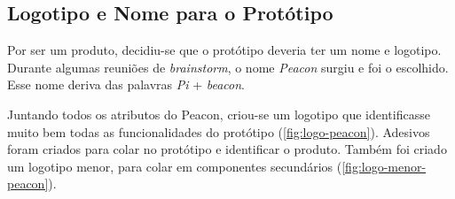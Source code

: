 \subsection{Logotipo e Nome para o Protótipo}\label{sec:logotipo-prototipo}

Por ser um produto, decidiu-se que o protótipo deveria ter um nome e logotipo. Durante algumas reuniões de \textit{brainstorm}, o nome \textit{Peacon} surgiu e foi o escolhido. Esse nome deriva das palavras \textit{Pi}  + \textit{beacon}.

Juntando todos os atributos do Peacon, criou-se um logotipo que identificasse muito bem todas as funcionalidades do protótipo (\autoref{fig:logo-peacon}). Adesivos foram criados para colar no protótipo e identificar o produto. Também foi criado um logotipo menor, para colar em componentes secundários (\autoref{fig:logo-menor-peacon}).


